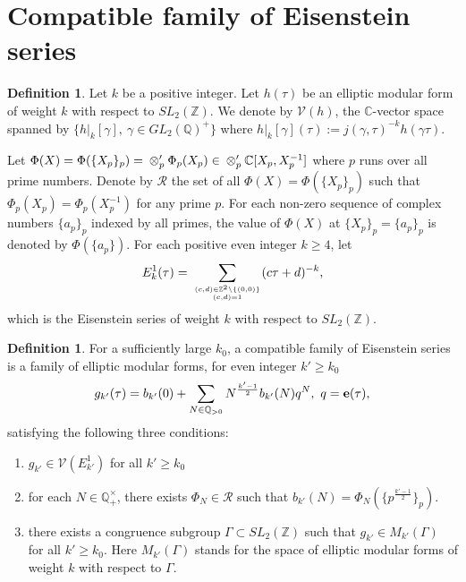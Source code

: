 \documentclass[11pt]{amsart}
\numberwithin{equation}{section}
\theoremstyle{definition}
\newtheorem{defin}[theorem]{Definition}
\begin{document}
\section{Compatible family of Eisenstein series}

\begin{defin}
Let $k$ be a positive integer. Let $h(\tau)$ be an elliptic modular form of weight $k$ with respect to $SL_2({\mathbb{Z}})$. 
We denote by $\mathcal V(h)$, the ${\mathbb{C}}$-vector space spanned by $\{ h|_k[\gamma],\ \gamma\in GL_2({\mathbb{Q}})^+\}$ where 
$h|_k[\gamma](\tau):=j(\gamma,\tau)^{-k}h(\gamma\tau)$. 
\end{defin}

Let $\Phi(X)=\Phi(\{X_p\}_p)={\displaystyle}\otimes'_p \Phi_p(X_p)\in {\displaystyle}\otimes'_p {\mathbb{C}}[X_p,X_p^{-1}]$ where $p$ runs over all prime numbers.  
Denote by $\mathcal R$ the set of all $\Phi(X)=\Phi(\{X_p\}_p)$ such that $\Phi_p(X_p)=\Phi_p(X_p^{-1})$ for any prime $p$.
For each non-zero sequence of complex numbers $\{a_p\}_p$ indexed by all primes, the value of $\Phi(X)$ at $\{X_p\}_p=\{a_p\}_p$ is denoted by $\Phi(\{a_p\})$. 
For each positive even integer $k\ge 4$, let 
$$E^1_{k}(\tau)={\displaystyle}\sum_{(c,d)\in {\mathbb{Z}}^2\setminus\{(0,0)\}\atop (c,d)=1}(c\tau+d)^{-k},
$$ 
which is the Eisenstein series of 
weight $k$ with respect to $SL_2({\mathbb{Z}})$. 

\begin{defin}\label{family} For a sufficiently large $k_0$, a compatible family of Eisenstein series is a family of elliptic modular forms, for even 
integer $k'\geq k_0$
$$g_{k'}(\tau)=b_{k'}(0)+\sum_{N\in{\mathbb{Q}}_{>0}} N^{\frac{k'-1}{2}} b_{k'}(N) q^N,\ q=\bold{e}(\tau), 
$$
satisfying the following three conditions:
\begin{enumerate}
\item $g_{k'}\in\mathcal V(E^1_{k'})$ for all $k'\geq k_0$
\item for each $N\in{\mathbb{Q}}_+^\times$, there exists $\Phi_N\in\mathcal R$ such that $b_{k'}(N)=\Phi_N(\{p^{\frac{k'-1}{2}}\}_p)$.
\item there exists a congruence subgroup $\Gamma\subset SL_2({\mathbb{Z}})$ such that $g_{k'}\in M_{k'}(\Gamma)$ for all $k'\geq k_0$. 
Here $ M_{k'}(\Gamma)$ stands for the space of elliptic modular forms of weight $k$ with respect to $\Gamma$.
\end{enumerate}
\end{defin}
\end{document}
